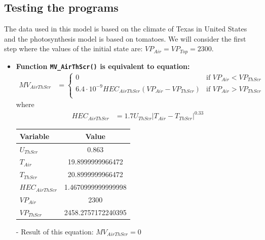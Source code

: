 \documentclass[a4paper]{article}
\numberwithin{equation}{section}
\begin{document}
\subsection{Testing the programs}
The data used in this model is based on the climate of Texas in United States and the photosynthesis model is based on tomatoes.
We will consider the first step where the values of the initial state are: \(VP_{Air} = VP_{Top} = 2300\).
\begin{itemize}
  \item \textbf{Function \texttt{MV\_AirThScr()} is equivalent to equation:}
        \begin{align*}
          MV_{AirThScr} & = \begin{cases}
            0                                                       & \text{if~} VP_{Air} < VP_{ThScr} \\
            6.4 \cdot 10^{-9} HEC_{AirThScr}(VP_{Air} - VP_{ThScr}) & \text{if~} VP_{Air} > VP_{ThScr} \\
          \end{cases}
        \end{align*}
        where
        \begin{align*}
          HEC_{AirThScr} & = 1.7 U_{ThScr} |T_{Air} - T_{ThScr}|^{0.33}
        \end{align*}

        \begin{table}[H]
          \centering
          \begin{tabular}{@{}lS[table-format=4.17]@{}}
            \toprule
            \textbf{Variable}  & \textbf{Value}     \\
            \midrule
            \(U_{ThScr}\)      & 0.863              \\
            \(T_{Air}\)        & 19.8999999966472   \\
            \(T_{ThScr}\)      & 20.8999999966472   \\
            \(HEC_{AirThScr}\) & 1.4670999999999998 \\
            \(VP_{Air}\)       & 2300               \\
            \(VP_{ThScr}\)     & 2458.2757172240395 \\
            \bottomrule
          \end{tabular}
        \end{table}

  \item[-] Result of this equation: \(MV_{AirThScr} = 0\)


\end{itemize}
\end{document}
